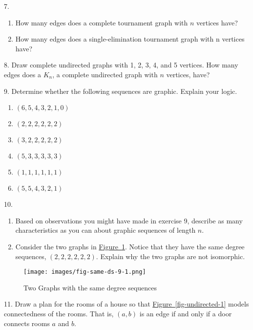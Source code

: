 \documentclass[10pt,]{book}
\theoremstyle{plain}
\theoremstyle{definition}
\theoremstyle{definition}
\theoremstyle{definition}
\theoremstyle{definition}
\theoremstyle{definition}
\numberwithin{equation}{section}
\begin{document}
\begin{exercisegroup}
\item[7.]\hypertarget{exercise-7}{}\leavevmode%
\begin{enumerate}[label=\alph*]
\item\hypertarget{li-13}{}How many edges does a complete tournament graph with \(n\) vertices have?%
\item\hypertarget{li-14}{}How many edges does a single-elimination tournament graph with n vertices have?%
\end{enumerate}
%
\par\smallskip
\item[8.]\hypertarget{exercise-8}{}Draw complete undirected graphs with 1, 2, 3, 4, and 5 vertices. How many edges does a \(K_n\), a complete undirected graph with \(n\) vertices, have?%
\par\smallskip
\item[9.]\hypertarget{exercise-9}{} Determine whether the following sequences are graphic. Explain your logic.%
\par
\leavevmode%
\begin{enumerate}[label=\alph*]
\item\hypertarget{li-15}{}  \((6, 5, 4, 3, 2, 1, 0)\)%
\item\hypertarget{li-16}{} \((2,2,2,2,2,2)\)%
\item\hypertarget{li-17}{} \((3,2,2,2,2,2)\)%
\item\hypertarget{li-18}{} \((5,3,3,3,3,3)\)%
\item\hypertarget{li-19}{} \((1,1,1,1,1,1)\)%
\item\hypertarget{li-20}{} \((5,5,4,3,2,1)\)%
\end{enumerate}
%
\par\smallskip
\item[10.]\hypertarget{exercise-10}{}\leavevmode%
\begin{enumerate}[label=\alph*]
\item\hypertarget{li-21}{}Based on observations you might have made in exercise 9, describe as many characteristics as you can about graphic sequences of length
\(n\).%
\item\hypertarget{li-22}{} Consider the two graphs in \hyperref[fig-same-ds-9-1]{Figure~\ref{fig-same-ds-9-1}}. Notice that they have the same degree sequences, \((2,2,2,2,2,2)\).  Explain why the two graphs are not isomorphic.%
\end{enumerate}
%
\leavevmode%
\begin{figure}
\centering
\texttt{[image: images/fig-same-ds-9-1.png]}
\caption{Two Graphs with the same degree sequences
                \label{fig-same-ds-9-1}}
\end{figure}
\par\smallskip
\item[11.]\hypertarget{exercise-house-9-1}{}Draw a plan for the rooms of a house so that \hyperref[fig-undirected-1]{Figure~\ref{fig-undirected-1}} models connectedness of the rooms.  That is, \((a,b)\) is an edge if and only if a door connects rooms \(a\) and \(b\). %
\par\smallskip
\end{exercisegroup}
\end{document}
